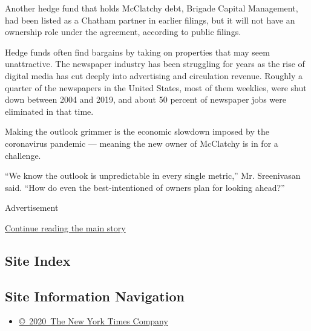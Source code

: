 Another hedge fund that holds McClatchy debt, Brigade Capital
Management, had been listed as a Chatham partner in earlier filings, but
it will not have an ownership role under the agreement, according to
public filings.

Hedge funds often find bargains by taking on properties that may seem
unattractive. The newspaper industry has been struggling for years as
the rise of digital media has cut deeply into advertising and
circulation revenue. Roughly a quarter of the newspapers in the United
States, most of them weeklies, were shut down between 2004 and 2019, and
about 50 percent of newspaper jobs were eliminated in that time.

Making the outlook grimmer is the economic slowdown imposed by the
coronavirus pandemic --- meaning the new owner of McClatchy is in for a
challenge.

``We know the outlook is unpredictable in every single metric,'' Mr.
Sreenivasan said. ``How do even the best-intentioned of owners plan for
looking ahead?''

Advertisement

\protect\hyperlink{after-bottom}{Continue reading the main story}

\hypertarget{site-index}{%
\subsection{Site Index}\label{site-index}}

\hypertarget{site-information-navigation}{%
\subsection{Site Information
Navigation}\label{site-information-navigation}}

\begin{itemize}
\tightlist
\item
  \href{https://help.nytimes.com/hc/en-us/articles/115014792127-Copyright-notice}{©~2020~The
  New York Times Company}
\end{itemize}

